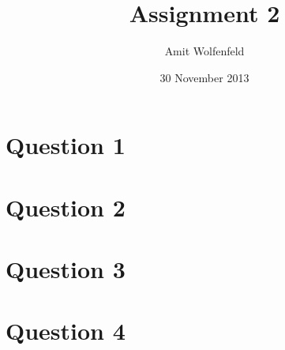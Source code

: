 \documentclass{article}
\title{Assignment 2}
\author{Amit Wolfenfeld}
\date{30 November 2013}
\begin{document}
\maketitle

\section*{Question 1}

\section*{Question 2}

\section*{Question 3}

\section*{Question 4}
\end{document}
